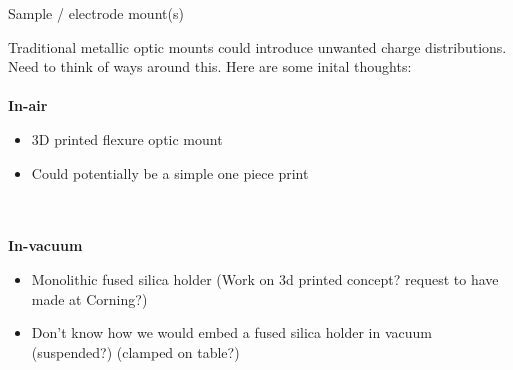 \documentclass{beamer}
\begin{document}
\begin{frame}{Sample / electrode mount(s)}
\item Traditional metallic optic mounts could introduce unwanted charge distributions. Need to think of ways around this. Here are some inital thoughts:
\\~\\
\textbf{In-air}
\begin{itemize} 
    \item 3D printed flexure optic mount
    \item Could potentially be a simple one piece print
\end{itemize}
\\~\\
\textbf{In-vacuum}
\begin{itemize}
    \item Monolithic fused silica holder (Work on 3d printed concept? request to have made at Corning?)
    \item Don’t know how we would embed a fused silica holder in vacuum (suspended?) (clamped on table?)
\end{itemize}
\end{frame}
\end{document}
